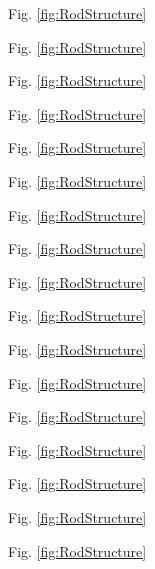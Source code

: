 Fig. \ref{fig:RodStructure}

Fig. \ref{fig:RodStructure}

Fig. \ref{fig:RodStructure}

Fig. \ref{fig:RodStructure}

Fig. \ref{fig:RodStructure}

Fig. \ref{fig:RodStructure}

Fig. \ref{fig:RodStructure}

Fig. \ref{fig:RodStructure}

Fig. \ref{fig:RodStructure}

Fig. \ref{fig:RodStructure}

Fig. \ref{fig:RodStructure}

Fig. \ref{fig:RodStructure}

Fig. \ref{fig:RodStructure}

Fig. \ref{fig:RodStructure}

Fig. \ref{fig:RodStructure}

Fig. \ref{fig:RodStructure}

Fig. \ref{fig:RodStructure}

